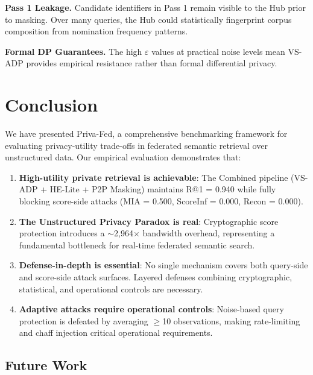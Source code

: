 \documentclass[conference]{IEEEtran}
\begin{document}
\textbf{Pass 1 Leakage.} Candidate identifiers in Pass 1 remain visible to the Hub prior to masking. Over many queries, the Hub could statistically fingerprint corpus composition from nomination frequency patterns.

\textbf{Formal DP Guarantees.} The high $\varepsilon$ values at practical noise levels mean VS-ADP provides empirical resistance rather than formal differential privacy.

\section{Conclusion}
\label{sec:conclusion}

We have presented Priva-Fed, a comprehensive benchmarking framework for evaluating privacy-utility trade-offs in federated semantic retrieval over unstructured data. Our empirical evaluation demonstrates that:

\begin{enumerate}
    \item \textbf{High-utility private retrieval is achievable}: The Combined pipeline (VS-ADP + HE-Lite + P2P Masking) maintains R@1 = 0.940 while fully blocking score-side attacks (MIA = 0.500, ScoreInf = 0.000, Recon = 0.000).
    
    \item \textbf{The Unstructured Privacy Paradox is real}: Cryptographic score protection introduces a $\sim$2,964$\times$ bandwidth overhead, representing a fundamental bottleneck for real-time federated semantic search.
    
    \item \textbf{Defense-in-depth is essential}: No single mechanism covers both query-side and score-side attack surfaces. Layered defenses combining cryptographic, statistical, and operational controls are necessary.
    
    \item \textbf{Adaptive attacks require operational controls}: Noise-based query protection is defeated by averaging $\geq$10 observations, making rate-limiting and chaff injection critical operational requirements.
\end{enumerate}

\subsection{Future Work}
\end{document}
